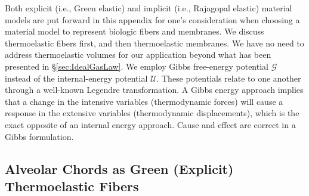 \label{appImplicitElasticity}

Both explicit (i.e., Green \cite{Green41} elastic) and implicit (i.e., Rajagopal \cite{Rajagopal03} elastic) material models are put forward in this appendix for one's consideration when choosing a material model to represent biologic fibers and membranes.  We discuss thermo\-elastic fibers first, and then thermo\-elastic membranes.  We have no need to address thermo\-elastic volumes for our application beyond what has been presented in \S\ref{sec:IdealGasLaw}.  We employ Gibbs free-energy potential $\mathcal{G}$ instead of the internal-energy potential $\mathcal{U}$.  These potentials relate to one another through a well-known Legendre transformation.  A Gibbs energy approach implies that a change in the intensive variables (thermo\-dynamic forces) will cause a response in the extensive variables (thermo\-dynamic displacements), which is the exact opposite of an internal energy approach.  Cause and effect are correct in a Gibbs formulation.

\subsection{Alveolar Chords as Green (Explicit) Thermoelastic Fibers}

